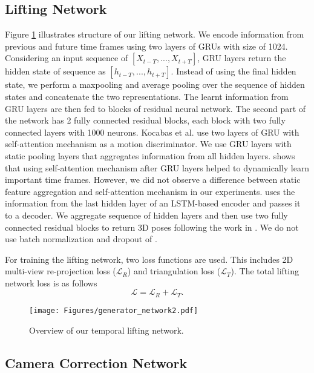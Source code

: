 \documentclass[10pt,twocolumn,letterpaper]{article}
\begin{document}
\subsection{Lifting Network}
Figure \ref{fig:liftingnet} illustrates structure of our lifting network. We encode information from previous and future time frames using two layers of GRUs with size of 1024. Considering an input sequence of $[X_{t-T},...,X_{t+T}]$, GRU layers return the hidden state of sequence as $[h_{t-T},...,h_{t+T}]$. Instead of using the final hidden state, we perform a maxpooling and average pooling over the sequence of hidden states and concatenate the two representations. The learnt information from GRU layers are then fed to blocks of residual neural network. The second part of the network has 2 fully connected residual blocks, each block with two fully connected layers with 1000 neurons. Kocabas et al. \cite{Kocabas_2020_CVPR} use two layers of GRU with self-attention mechanism as a motion discriminator. We use GRU layers with static pooling layers that aggregates information from all hidden layers. \cite{Kocabas_2020_CVPR} shows that using self-attention mechanism after GRU layers helped to dynamically learn important time frames. However, we did not observe a difference between static feature aggregation and self-attention mechanism in our experiments. \cite{Hossain_2018_ECCV} uses the information from the last hidden layer of an LSTM-based encoder and passes it to a decoder. We aggregate sequence of hidden layers and then use two fully connected residual blocks to return 3D poses following the work in \cite{Martinez_2017_ICCV}. We do not use batch normalization and dropout of \cite{Martinez_2017_ICCV}. 

For training the lifting network, two loss functions are used. This includes 2D multi-view re-projection loss ($\mathcal{L}_{R}$) and triangulation loss ($\mathcal{L}_{T}$). The total lifting network loss is as follows
\begin{equation}
\mathcal{L}=\mathcal{L}_{R}+\mathcal{L}_{T}.
\label{equ:lifting_loss}
\end{equation}
\begin{figure}[t]
\begin{center}
\texttt{[image: Figures/generator\_network2.pdf]}
\end{center}
  \caption{Overview of our temporal lifting network.}
\label{fig:liftingnet}
\end{figure} 

\subsection{Camera Correction Network}
\label{sec:camera net}
\end{document}
